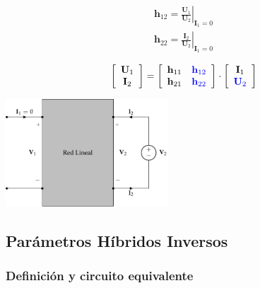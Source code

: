 \documentclass[10pt]{article}
\begin{document}
\begin{minipage}{0.5\textwidth}
  \[
    \begin{array}{c}
      \mathbf{h}_{12} = \left.\frac{\mathbf{U}_1}{\mathbf{U}_2}\right\rvert_{\mathbf{I}_1 = 0}\\
      \mathbf{h}_{22} = \left.\frac{\mathbf{I}_2}{\mathbf{U}_2}\right\rvert_{\mathbf{I}_1 = 0}
    \end{array}
  \]

  \[
    \left[
      \begin{array}{c}
        \mathbf{U}_1\\
        \mathbf{I}_2
      \end{array}
    \right] =
    \left[
      \begin{array}{cc}
        \mathbf{h}_{11} & \color{blue}{\mathbf{h}_{12}}\\
        \mathbf{h}_{21} & \color{blue}{\mathbf{h}_{22}}
      \end{array}
    \right] \cdot
    \left[
      \begin{array}{c}
        \mathbf{I}_1\\
        \color{blue}{\mathbf{U}_2}
      \end{array}
    \right]
  \]
\end{minipage}
\begin{minipage}{0.5\textwidth}
  \begin{center}
    \includegraphics[height=4cm]{../figs/parametrosH_salida.pdf}
  \end{center}
\end{minipage}

\clearpage

\subsection{Parámetros Híbridos Inversos}

\subsubsection*{Definición y circuito equivalente}
\end{document}
